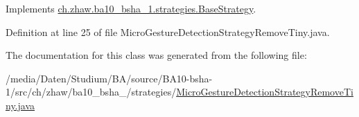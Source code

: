 Implements \hyperlink{classch_1_1zhaw_1_1ba10__bsha__1_1_1strategies_1_1BaseStrategy_af6ea27835befac71906915236a347450}{ch.zhaw.ba10\_\-bsha\_\-1.strategies.BaseStrategy}.

Definition at line 25 of file MicroGestureDetectionStrategyRemoveTiny.java.

The documentation for this class was generated from the following file:\begin{DoxyCompactItemize}
\item 
/media/Daten/Studium/BA/source/BA10-\/bsha-\/1/src/ch/zhaw/ba10\_\-bsha\_/strategies/\hyperlink{MicroGestureDetectionStrategyRemoveTiny_8java}{MicroGestureDetectionStrategyRemoveTiny.java}\end{DoxyCompactItemize}
